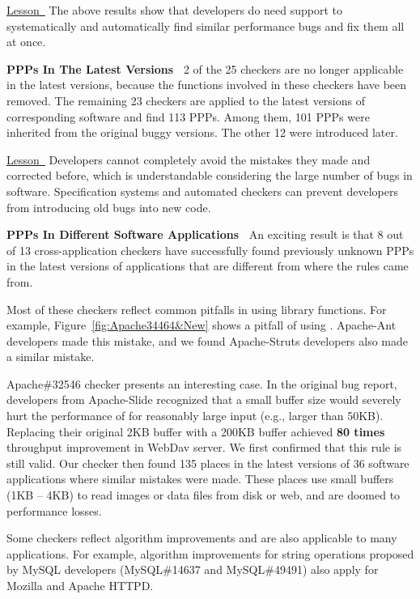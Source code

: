 \underline{Lesson\ } 
The above results show that developers do need support to systematically and 
automatically find similar performance bugs and fix them all at 
once.

{\bf PPPs In The Latest Versions\ }
2 of the 25 checkers are no longer applicable in the latest versions,
because the functions involved in these checkers
have been removed. The remaining 23 checkers are applied to
the latest versions of corresponding software and find
113 PPPs. Among them, 101 PPPs were
inherited from the original buggy versions.
The other 12 were introduced later. 

\underline{Lesson\ }
Developers cannot completely avoid the mistakes they made
and corrected before, which is understandable considering the large number of bugs in
software.
Specification systems and automated checkers can prevent developers 
from introducing old bugs into new code.

{\bf PPPs In Different Software Applications\ }
An exciting result is that 8 out of 13 cross-application checkers 
have successfully found previously unknown
PPPs in the latest versions of applications that are different from
where the rules came from.

Most of these checkers reflect common pitfalls in using
library functions. For example, Figure~\ref{fig:Apache34464&New} shows a pitfall
of using . Apache-Ant developers made this
mistake, and we found Apache-Struts developers also made a similar mistake.

Apache\#32546 checker presents an interesting case. In the original 
bug report, developers from Apache-Slide recognized that
a small buffer size would severely hurt the performance of 
for reasonably large input
(e.g., larger than 50KB). Replacing their original
2KB buffer with a 200KB buffer achieved {\bf 80 times} throughput 
improvement in WebDav server. We first confirmed that this rule is
still valid. Our checker then found 135 places
in the latest versions of 36 software applications where similar mistakes were made.
These places use small buffers (1KB -- 4KB) to read images or data
files from disk or web, and are doomed to performance losses.

Some checkers reflect algorithm improvements and are also applicable to
many applications. For example, algorithm improvements for string operations 
proposed by MySQL developers (MySQL\#14637 and MySQL\#49491) also apply for
Mozilla and Apache HTTPD.



